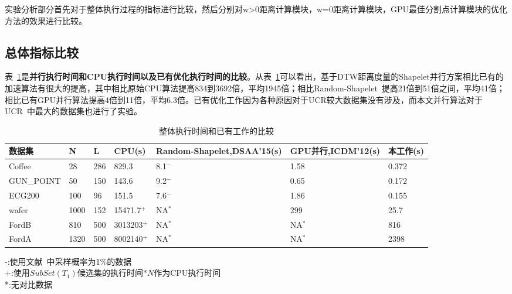 实验分析部分首先对于整体执行过程的指标进行比较，然后分别对w>0距离计算模块，w=0距离计算模块，GPU最佳分割点计算模块的优化方法的效果进行比较。

\subsection{总体指标比较}
\label{cha:chap05:Analysis:Overall}

表~\ref{tab:CompareWithOthers}是\textbf{并行执行时间和CPU执行时间以及已有优化执行时间的比较}。从表~\ref{tab:CompareWithOthers}可以看出，基于DTW距离度量的Shapelet并行方案相比已有的加速算法有很大的提高，其中相比原始CPU算法提高834到3692倍，平均1945倍；相比Random-Shapelet~\cite{renard2015random}提高21倍到51倍之间，平均41倍；相比已有GPU并行算法提高4倍到11倍，平均6.3倍。已有优化工作因为各种原因对于UCR较大数据集没有涉及，而本文并行算法对于UCR~\cite{UCRArchive}中最大的数据集也进行了实验。

\begin{table}[htbp]
	\centering
	\begin{minipage}{\textwidth}
		\caption{整体执行时间和已有工作的比较}
		\label{tab:CompareWithOthers}
		\begin{tabular}{p{2cm}p{1cm}p{1cm}p{1.5cm}p{3.2cm}p{2.2cm}p{1.5cm}}
			\toprule[1.5pt]
			{\heiti 数据集} & {\heiti N } &{\heiti L } &{\heiti CPU(s) } &{\heiti Random-Shapelet,DSAA'15(s) } &{\heiti GPU并行,ICDM'12(s) } &{\heiti 本工作(s) }
			\\\midrule[1pt]
			Coffee & 28 & 286 & 829.3 & 8.1$^-$ &  1.58 & 0.372 \\
			GUN\_POINT & 50 & 150 & 143.6 & 9.2$^-$ & 0.65 & 0.172 \\
			ECG200 & 100 & 96 & 151.5 & 7.6$^-$ & 1.86 & 0.155 \\
			wafer & 1000 & 152 & 15471.7$^+$ & NA$^*$ & 299 & 25.7 \\
			FordB & 810 & 500 & 3013203$^+$ & NA$^*$ & NA$^*$ & 816 \\
			FordA & 1320 & 500 & 8002140$^+$ & NA$^*$ & NA$^*$ &  2398\\
			\bottomrule[1.5pt]
		\end{tabular}
		\footnotesize -:使用文献~\cite{renard2015random}中采样概率为1\%的数据 \\
		+:使用$SubSet(T_1)$候选集的执行时间$*N$作为CPU执行时间 \\
		*:无对比数据 \\
	\end{minipage}
\end{table}


